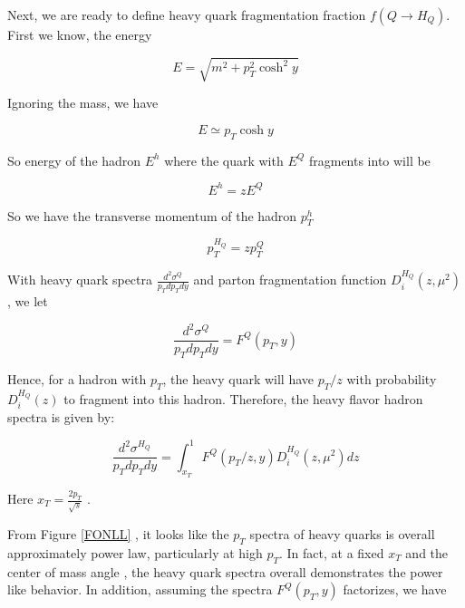 Next, we are ready to define heavy quark fragmentation fraction $f(Q \rightarrow H_Q)$. First we know, the energy

\begin{equation}
E=  \sqrt{m^2 + p_T^2 \cosh^2 y}
\end{equation}

Ignoring the mass, we have

\begin{equation}
E \simeq p_T \cosh y
\end{equation}

So energy of the hadron $E^h$ where the quark with $E^Q$ fragments into will be


\begin{equation}
E^h  = z E^Q 
\end{equation}

So we have the transverse momentum of the hadron $p_T^h$ 

\begin{equation}
p_T^{H_Q} = z p_T^Q
\end{equation}

With heavy quark spectra $ \frac{d^2\sigma^Q}{p_T dp_T dy}$ and parton fragmentation function $D_{i}^{H_Q}(z,\mu^2)$, we let


\begin{equation}
 \frac{d^2\sigma^Q}{p_T dp_T dy} = F^Q(p_T, y)
\end{equation}


Hence, for a hadron with $p_T$, the heavy quark will have $p_T/z$ with probability $D^{H_Q}_{i}(z)$ to fragment into this hadron. Therefore, the heavy flavor hadron spectra is given by:

\begin{equation}
\frac{d^2\sigma^{H_Q}}{p_T dp_T dy} = \int_{x_T}^1 F^Q(p_T/z, y) D_{i}^{H_Q}(z,\mu^2) dz
\end{equation}

Here $x_T = \frac{2p_T}{\sqrt s}$ \cite{HadronScale}.







\iffalse



From Figure \ref{FONLL} , it looks like the $p_T$ spectra of heavy quarks is overall approximately power law, particularly at high $p_T$. In fact, at a fixed $x_T$ and the center of mass angle \cite{HadronScale}, the heavy quark spectra overall demonstrates the power like behavior. In addition, assuming the spectra $F^Q(p_T,y)$ factorizes, we have
 

